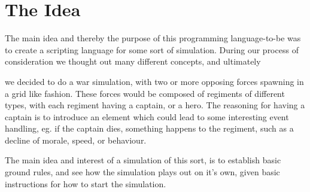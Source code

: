 \section{The Idea}

	The main idea and thereby the purpose of this programming language-to-be 
	was to create a scripting language for some sort of simulation. 
	During our process of consideration we thought out many different concepts, 
	and ultimately 
	
	\begin{comment}we came to a decision that it would be more interesting to 
	have a controlled environment with a lot of units participating. Reasons for 
	this is that the simulation would not be very interesting to perform when dealing with minor numbers, 
	the reasoning behind this is that we do not expect to make a very complicated simulation, therefore dealing in larger numbers proved 
	more interesting to us. \newline
	
	Ultimately\end{comment}
	
	we decided to do a war simulation, with two or more opposing forces 
	spawning in a grid like fashion. These forces would be composed of regiments of 
	different types, with each regiment having a captain, or a hero. The reasoning for having a 
	captain is to introduce an element which could lead to some interesting event handling, 
	eg. if the captain dies, something happens to the regiment, such as a decline of morale, speed, or behaviour. \newline
	
	The main idea and interest of a simulation of this sort, is to establish basic ground rules, 
	and see how the simulation plays out on it's own, given basic instructions for how to start the simulation.